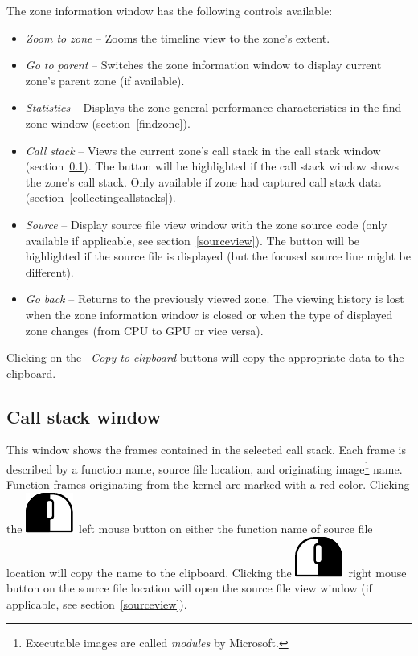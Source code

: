 \documentclass[hidelinks,titlepage,a4paper]{article}
\newcommand{\LMB}{\includegraphics[height=.8\baselineskip]{icons/lmb}}
\newcommand{\RMB}{\includegraphics[height=.8\baselineskip]{icons/rmb}}
\begin{document}
The zone information window has the following controls available:

\begin{itemize}
\item \emph{\faMicroscope{} Zoom to zone} -- Zooms the timeline view to the zone's extent.
\item \emph{\faArrowUp{} Go to parent} -- Switches the zone information window to display current zone's parent zone (if available).
\item \emph{\faChartBar{} Statistics} -- Displays the zone general performance characteristics in the find zone window (section~\ref{findzone}).
\item \emph{\faAlignJustify{} Call stack} -- Views the current zone's call stack in the call stack window (section~\ref{callstackwindow}). The button will be highlighted if the call stack window shows the zone's call stack. Only available if zone had captured call stack data (section~\ref{collectingcallstacks}).
\item \emph{\faFile*{} Source} -- Display source file view window with the zone source code (only available if applicable, see section~\ref{sourceview}). The button will be highlighted if the source file is displayed (but the focused source line might be different).
\item \emph{\faArrowLeft{} Go back} -- Returns to the previously viewed zone. The viewing history is lost when the zone information window is closed or when the type of displayed zone changes (from CPU to GPU or vice versa).
\end{itemize}

Clicking on the \emph{\faClipboard{}~Copy to clipboard} buttons will copy the appropriate data to the clipboard.

\subsection{Call stack window}
\label{callstackwindow}

This window shows the frames contained in the selected call stack. Each frame is described by a function name, source file location, and originating image\footnote{Executable images are called \emph{modules} by Microsoft.} name. Function frames originating from the kernel are marked with a red color. Clicking the \LMB{}~left mouse button on either the function name of source file location will copy the name to the clipboard. Clicking the \RMB{}~right mouse button on the source file location will open the source file view window (if applicable, see section~\ref{sourceview}).
\end{document}
